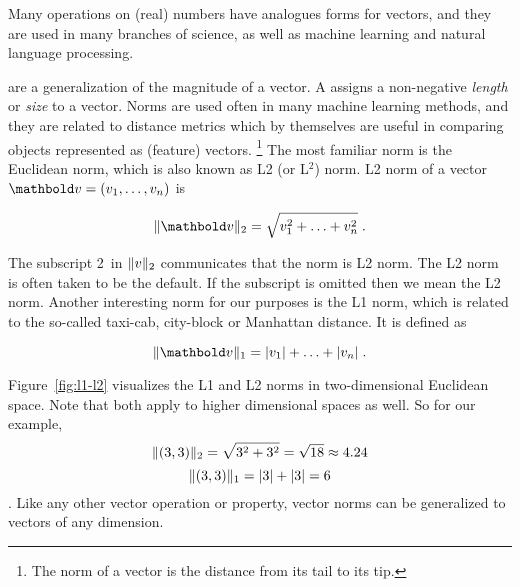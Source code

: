 Many operations on (real) numbers have analogues forms for vectors,
and they are used in many branches of science,
as well as machine learning and natural language processing.

 are
a generalization of the magnitude of a vector.
A  assigns a non-negative \emph{length} or \emph{size} to a vector.
Norms are used often in many machine learning methods,
and they are related to distance metrics which by themselves are useful in comparing objects represented as (feature) vectors.%
\footnote{The norm of a vector is the distance from its tail to its tip.}
The most familiar norm is the Euclidean norm,
which is also known as L2 (or L$^{\text{2}}$) norm.
L2 norm of a vector $\vect{v} = (v_{1}, \ldots, v_{n})$ is

\[
  \norm{\vect{v}}_{2} = \sqrt{v_{1}^{2} + \ldots + v_{n}^{2}}\;.
\]

The subscript 2\ in $\lVert v\rVert_{2}$ communicates that the norm is L2 norm.
The L2 norm is often taken to be the default.
If the subscript is omitted then we mean the L2 norm.
Another interesting norm for our purposes is the L1 norm,
which is related to the so-called taxi-cab, city-block or Manhattan distance.
It is defined as

\[
  \norm{\vect{v}}_{1} = \lvert{}v_{1}\rvert + \ldots + \lvert{}v_{n}\rvert\;.
\]

\begin{marginfigure}[5ex]
  \caption{\label{fig:l1-l2}%
    Visualizations of L2(solid \textcolor{blue}{blue})
    and example L1
    (dotted \textcolor{green}{green},
            \textcolor{orange}{orange}
        and \textcolor{red}{red})
    norms vector $(3,3)$.}
\end{marginfigure}

Figure~\ref{fig:l1-l2} visualizes the L1 and L2 norms
in two-dimensional Euclidean space.
Note that both apply to higher dimensional spaces as well.
So for our example,
\[ \lVert(3,3)\rVert_{2} = \sqrt{3^{2} + 3^{2}} = \sqrt{18} \approx 4.24\]
\[ \lVert(3,3)\rVert_{1} = \lvert{}3\rvert + \lvert{}3\rvert = 6 \]\;.
Like any other vector operation or property,
vector norms can be generalized to vectors of any dimension.

